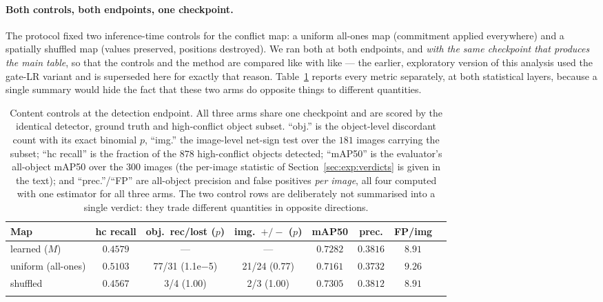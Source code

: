 \documentclass[pdflatex,sn-mathphys-num]{sn-jnl}
\theoremstyle{thmstyleone}%
\theoremstyle{thmstyletwo}%
\theoremstyle{thmstylethree}%
\begin{document}
\paragraph{Both controls, both endpoints, one checkpoint.}
The protocol fixed two inference-time controls for the conflict map: a uniform all-ones map (commitment applied everywhere) and a spatially shuffled map (values preserved, positions destroyed). We ran both at both endpoints, and \emph{with the same checkpoint that produces the main table}, so that the controls and the method are compared like with like --- the earlier, exploratory version of this analysis used the gate-LR variant and is superseded here for exactly that reason. Table~\ref{tab:controls} reports every metric separately, at both statistical layers, because a single summary would hide the fact that these two arms do opposite things to different quantities.

\begin{table}[t]
\caption{Content controls at the detection endpoint. All three arms share one checkpoint and are scored by the identical detector, ground truth and high-conflict object subset. ``obj.'' is the object-level discordant count with its exact binomial $p$, ``img.'' the image-level net-sign test over the $181$ images carrying the subset; ``hc recall'' is the fraction of the $878$ high-conflict objects detected; ``mAP50'' is the evaluator's all-object mAP50 over the $300$ images (the per-image statistic of Section~\ref{sec:exp:verdicts} is given in the text); and ``prec.''/``FP'' are all-object precision and false positives \emph{per image}, all four computed with one estimator for all three arms. The two control rows are deliberately not summarised into a single verdict: they trade different quantities in opposite directions.}
\label{tab:controls}%
\footnotesize
\setlength{\tabcolsep}{4pt}
\begin{tabular}{@{}lccccccc@{}}
\toprule
Map & hc recall & obj.\ rec/lost ($p$) & img.\ $+/-$ ($p$) & mAP50 & prec. & FP/img \\
\midrule
learned ($M$) & $0.4579$ & --- & --- & $\mathbf{0.7282}$ & $0.3816$ & $8.91$ \\
uniform (all-ones) & $\mathbf{0.5103}$ & 77/31 (1.1e$-$5) & 21/24 (0.77) & $0.7161$ & $0.3732$ & $9.26$ \\
shuffled & $0.4567$ & 3/4 (1.00) & 2/3 (1.00) & $\mathbf{0.7305}$ & $0.3812$ & $8.91$ \\
\botrule
\end{tabular}
\end{table}
\end{document}
